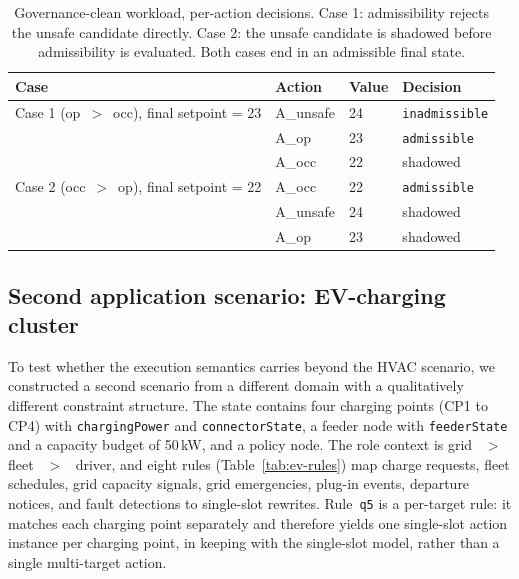 \documentclass{ieeeaccess}
\theoremstyle{definition}
\theoremstyle{plain}
\theoremstyle{remark}
\begin{document}
\begin{table}[t]
\caption{Governance-clean workload, per-action decisions. Case 1: admissibility rejects the unsafe candidate directly. Case 2: the unsafe candidate is shadowed before admissibility is evaluated. Both cases end in an admissible final state.}
\label{tab:governance}
\centering
\small
\begin{tabular}{|p{2.5cm}|p{1.5cm}|p{0.9cm}|p{2.1cm}|}
\hline
\textbf{Case} & \textbf{Action} & \textbf{Value} & \textbf{Decision} \\
\hline
Case 1 (op~$>$~occ), final setpoint = 23 & A\_unsafe & 24 & \texttt{inadmissible} \\
\hline
                                   & A\_op     & 23 & \texttt{admissible}   \\
\hline
                                   & A\_occ    & 22 & shadowed              \\
\hline
Case 2 (occ~$>$~op), final setpoint = 22 & A\_occ    & 22 & \texttt{admissible}   \\
\hline
                                   & A\_unsafe & 24 & shadowed              \\
\hline
                                   & A\_op     & 23 & shadowed              \\
\hline
\end{tabular}
\end{table}

\subsection{Second application scenario: EV-charging cluster}
\label{sec:eval:ev}

To test whether the execution semantics carries beyond the HVAC scenario, we constructed a second scenario from a different domain with a qualitatively different constraint structure. The state contains four charging points (CP1 to CP4) with \texttt{chargingPower} and \texttt{connectorState}, a feeder node with \texttt{feederState} and a capacity budget of 50\,kW, and a policy node. The role context is grid ~$>$~ fleet ~$>$~ driver, and eight rules (Table~\ref{tab:ev-rules}) map charge requests, fleet schedules, grid capacity signals, grid emergencies, plug-in events, departure notices, and fault detections to single-slot rewrites. Rule~\texttt{q5} is a per-target rule: it matches each charging point separately and therefore yields one single-slot action instance per charging point, in keeping with the single-slot model, rather than a single multi-target action.
\end{document}
